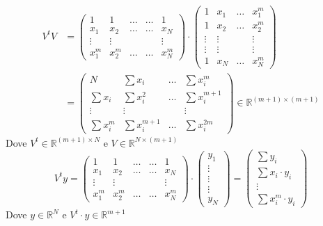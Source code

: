 \[\begin{split}
    V^tV & = \begin{pmatrix}
        1 & 1 & \dotso & \dotso & 1 \\
        x_1 & x_2 & \dotso & \dotso & x_N \\
        \vdots & \vdots & & & \vdots \\
        x_1^m & x_2^m & \dotso & \dotso & x_N^m
    \end{pmatrix} \cdot
    \begin{pmatrix}
        1 & x_1 & \dotso & x_1^m \\
        1 & x_2 & \dotso & x_2^m \\
        \vdots & \vdots & & \vdots \\
        \vdots & \vdots & & \vdots \\
        1 & x_N & \dotso & x_N^m
    \end{pmatrix} \\
    & = \begin{pmatrix}
        N & \sum x_i & \dotso & \sum x_i^m \\
        \sum x_i & \sum x_i^2 & \dotso & \sum x_i^{m+1} \\
        \vdots & \vdots & & \vdots \\
        \sum x_i^m & \sum x_i^{m+1} & \dotso & \sum x_i^{2m}
    \end{pmatrix} \in \mathbb{R}^{(m+1)\times(m+1)}
\end{split}\]
Dove $V^t \in \mathbb{R}^{(m+1)\times N}$ e $V \in \mathbb{R}^{N\times (m+1)}$
\[
V^t y =
\begin{pmatrix}
1 & 1 & \dotso & \dotso & 1 \\
x_1 & x_2 & \dotso & \dotso & x_N \\
\vdots & \vdots & & & \vdots \\
x_1^m & x_2^m & \dotso & \dotso & x_N^m
\end{pmatrix}
\cdot
\begin{pmatrix}
y_1 \\ \vdots \\ \vdots \\ \vdots \\ y_N
\end{pmatrix}
=
\begin{pmatrix}
\sum y_i \\
\sum x_i \cdot y_i \\ \vdots \\ \sum x_i^m \cdot y_i
\end{pmatrix}
\]
Dove $y \in \mathbb{R}^N$ e $V^t \cdot y \in \mathbb{R}^{m+1}$\\

